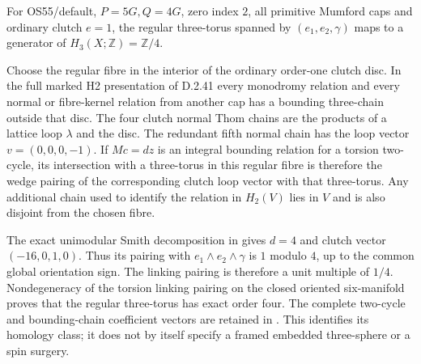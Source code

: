 For OS55/default, $P=5G,Q=4G$, zero index $2$, all primitive
Mumford caps and ordinary clutch $e=1$, the regular three-torus
spanned by $(e_1,e_2,\gamma)$ maps to a generator of
$H_3(X;\mathbb Z)=\mathbb Z/4$.

Choose the regular fibre in the interior of the ordinary order-one
clutch disc. In the full marked H2 presentation of D.2.41 every
monodromy relation and every normal or fibre-kernel relation from
another cap has a bounding three-chain outside that disc.
The four clutch normal Thom chains are the products of a lattice
loop $\lambda$ and the disc. The redundant fifth normal chain
has the loop vector $v=(0,0,0,-1)$.
If $M c=d z$ is an integral bounding relation for a torsion
two-cycle, its intersection with a three-torus in this regular
fibre is therefore the wedge pairing of the corresponding clutch
loop vector with that three-torus. Any additional chain used to
identify the relation in $H_2(V)$ lies in $V$ and is also disjoint
from the chosen fibre.

The exact unimodular Smith decomposition in
 gives $d=4$ and
clutch vector $(-16,0,1,0)$. Thus its pairing with
$e_1\wedge e_2\wedge\gamma$ is $1$ modulo $4$, up to the
common global orientation sign. The linking pairing is
therefore a unit multiple of $1/4$. Nondegeneracy of the
torsion linking pairing on the closed oriented six-manifold
proves that the regular three-torus has exact order four.
The complete two-cycle and bounding-chain coefficient vectors
are retained in .
This identifies its homology class; it does not by itself
specify a framed embedded three-sphere or a spin surgery.
